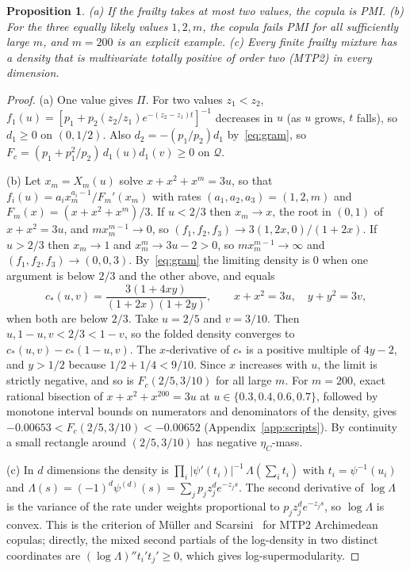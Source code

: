 \documentclass[11pt,a4paper]{article}
\newtheorem{proposition}[theorem]{Proposition}
\theoremstyle{remark}
\newcommand{\Qq}{\mathcal Q}
\begin{document}
\begin{proposition}\label{prop:frailty}
(a) If the frailty takes at most two values, the copula is PMI.
(b) For the three equally likely values $1,2,m$, the copula fails PMI for all sufficiently large $m$, and $m=200$ is an explicit example.
(c) Every finite frailty mixture has a density that is multivariate totally positive of order two (MTP2) in every dimension.
\end{proposition}
\begin{proof}
(a) One value gives $\Pi$. For two values $z_1<z_2$,
$f_1(u)=[p_1+p_2(z_2/z_1)e^{-(z_2-z_1)t}]^{-1}$ decreases in $u$ (as $u$ grows, $t$ falls), so $d_1\geq0$ on $(0,1/2)$. Also $d_2=-(p_1/p_2)d_1$ by~\eqref{eq:gram}, so $F_c=(p_1+p_1^2/p_2)\,d_1(u)d_1(v)\geq0$ on $\Qq$.

(b) Let $x_m=X_m(u)$ solve $x+x^2+x^m=3u$, so that $f_i(u)=a_ix_m^{a_i-1}/F_m'(x_m)$ with rates $(a_1,a_2,a_3)=(1,2,m)$ and $F_m(x)=(x+x^2+x^m)/3$. If $u<2/3$ then $x_m\to x$, the root in $(0,1)$ of $x+x^2=3u$, and $mx_m^{m-1}\to0$, so $(f_1,f_2,f_3)\to3(1,2x,0)/(1+2x)$. If $u>2/3$ then $x_m\to1$ and $x_m^m\to3u-2>0$, so $mx_m^{m-1}\to\infty$ and $(f_1,f_2,f_3)\to(0,0,3)$. By~\eqref{eq:gram} the limiting density is $0$ when one argument is below $2/3$ and the other above, and equals
\[
 c_*(u,v)=\frac{3(1+4xy)}{(1+2x)(1+2y)},\qquad x+x^2=3u,\quad y+y^2=3v,
\]
when both are below $2/3$. Take $u=2/5$ and $v=3/10$. Then $u,1-u,v<2/3<1-v$, so the folded density converges to $c_*(u,v)-c_*(1-u,v)$. The $x$-derivative of $c_*$ is a positive multiple of $4y-2$, and $y>1/2$ because $1/2+1/4<9/10$. Since $x$ increases with $u$, the limit is strictly negative, and so is $F_c(2/5,3/10)$ for all large $m$. For $m=200$, exact rational bisection of $x+x^2+x^{200}=3u$ at $u\in\{0.3,0.4,0.6,0.7\}$, followed by monotone interval bounds on numerators and denominators of the density, gives $-0.00653<F_c(2/5,3/10)<-0.00652$ (Appendix~\ref{app:scripts}). By continuity a small rectangle around $(2/5,3/10)$ has negative $\eta_C$-mass.

(c) In $d$ dimensions the density is $\prod_i|\psi'(t_i)|^{-1}\,\Lambda(\sum_it_i)$ with $t_i=\psi^{-1}(u_i)$ and $\Lambda(s)=(-1)^d\psi^{(d)}(s)=\sum_jp_jz_j^de^{-z_js}$. The second derivative of $\log\Lambda$ is the variance of the rate under weights proportional to $p_jz_j^de^{-z_js}$, so $\log\Lambda$ is convex. This is the criterion of M\"uller and Scarsini~\cite{ms} for MTP2 Archimedean copulas; directly, the mixed second partials of the log-density in two distinct coordinates are $(\log\Lambda)''t_i't_j'\geq0$, which gives log-supermodularity.
\end{proof}
\end{document}
